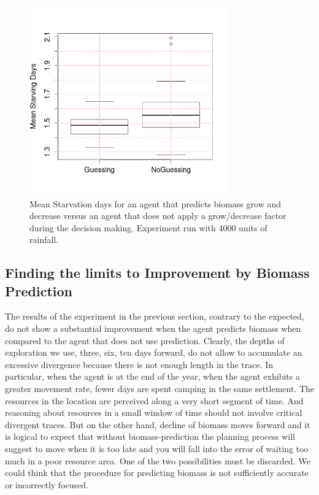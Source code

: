 \documentclass[11pt,oneside,a4paper,openright]{report}
\begin{document}
\begin{figure}[!htb]
\centering
\includegraphics[height=8.2cm]{figures/expm/guessVSnoguess_clim4000.png}
\caption{Mean Starvation days for an agent that predicts biomass grow and decrease versus
an agent that does not apply a grow/decrease factor during the decision making. Experiment 
run with 4000 units of rainfall. }
\label{fig:guessVSnoguess_clim4000.png}
\end{figure}


\subsection{Finding the limits to Improvement by Biomass Prediction}
\label{sec:NoDepletionExperiment}


The results of the experiment in the previous section, contrary to the expected, do not show a substantial 
improvement when the agent predicts biomass when compared to the agent that does not use prediction. Clearly,
the depths of exploration we use, three, six, ten days forward, do not allow to accumulate an excessive 
divergence because there is not enough length in the trace. In particular, when the agent is at the 
end of the year, when the agent exhibits a greater movement rate, fewer days are spent camping in the same 
settlement. The resources in the location are perceived along a very short segment of time. And reasoning
about resources in a small window of time should not involve critical divergent traces. But on the other hand,
decline of biomass moves forward and it is logical to expect that without biomass-prediction the planning
process will suggest to move when it is too late and you will fall into the error of waiting too much in a
poor resource area. One of the two possibilities must be discarded. We could think that the procedure for 
predicting biomass is not sufficiently accurate or incorrectly focused. 
\end{document}
